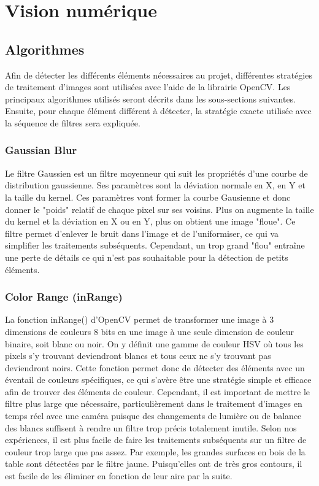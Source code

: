 \chapter{Vision numérique}

\section{Algorithmes}

Afin de détecter les différents éléments nécessaires au projet, différentes stratégies de traitement d'images sont utilisées avec l'aide de la librairie OpenCV. Les principaux algorithmes utilisés seront décrits dans les sous-sections suivantes. Ensuite, pour chaque élément différent à détecter, la stratégie exacte utilisée avec la séquence de filtres sera expliquée.

\subsection{Gaussian Blur}

Le filtre Gaussien est un filtre moyenneur qui suit les propriétés d'une courbe de distribution gaussienne. Ses paramètres sont la déviation normale en X, en Y et la taille du kernel. Ces paramètres vont former la courbe Gausienne et donc donner le "poids" relatif de chaque pixel sur ses voisins. Plus on augmente la taille du kernel et la déviation en X ou en Y, plus on obtient une image "floue". Ce filtre permet d'enlever le bruit dans l'image et de l'uniformiser, ce qui va simplifier les traitements subséquents. Cependant, un trop grand "flou" entraîne une perte de détails ce qui n'est pas souhaitable pour la détection de petits éléments.

\subsection{Color Range (inRange)}

La fonction inRange() d'OpenCV permet de transformer une image à 3 dimensions de couleurs 8 bits en une image à une seule dimension de couleur binaire, soit blanc ou noir. On y définit une gamme de couleur HSV où tous les pixels s'y trouvant deviendront blancs et tous ceux ne s'y trouvant pas deviendront noirs. Cette fonction permet donc de détecter des éléments avec un éventail de couleurs spécifiques, ce qui s'avère être une stratégie simple et efficace afin de trouver des éléments de couleur. Cependant, il est important de mettre le filtre plus large que nécessaire, particulièrement dans le traitement d'images en temps réel avec une caméra puisque des changements de lumière ou de balance des blancs suffisent à rendre un filtre trop précis totalement inutile. Selon nos expériences, il est plus facile de faire les traitements subséquents sur un filtre de couleur trop large que pas assez. Par exemple, les grandes surfaces en bois de la table sont détectées par le filtre jaune. Puisqu'elles ont de très gros contours, il est facile de les éliminer en fonction de leur aire par la suite.

